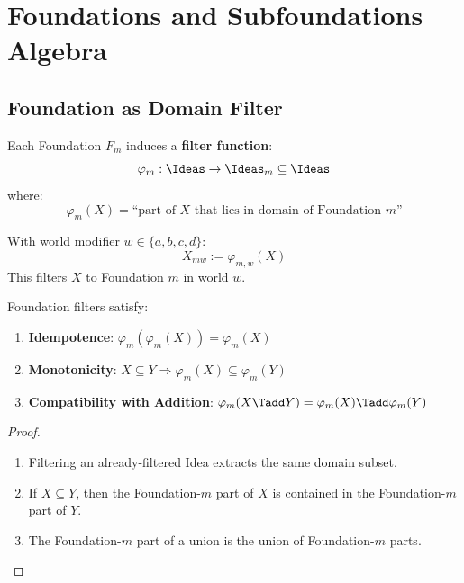 \chapter{Foundations and Subfoundations Algebra}
\label{ch:foundations-algebra}

\section{Foundation as Domain Filter}

\begin{definition}
\label{def:foundation-filter}
Each Foundation $F_m$ induces a \textbf{filter function}:
\[
\varphi_m : \Ideas \to \Ideas_m \subseteq \Ideas
\]
where:
\[
\varphi_m(X) = \text{``part of } X \text{ that lies in domain of Foundation } m\text{''}
\]
\end{definition}

\begin{definition}
\label{def:subfound-filter}
With world modifier $w \in \{a, b, c, d\}$:
\[
X_{mw} := \varphi_{m,w}(X)
\]
This filters $X$ to Foundation $m$ in world $w$.
\end{definition}

\begin{theorem}
\label{thm:filter-props}
Foundation filters satisfy:
\begin{enumerate}
  \item \textbf{Idempotence}: $\varphi_m(\varphi_m(X)) = \varphi_m(X)$
  \item \textbf{Monotonicity}: $X \subseteq Y \Rightarrow \varphi_m(X) \subseteq \varphi_m(Y)$
  \item \textbf{Compatibility with Addition}: $\varphi_m(X \Tadd Y) = \varphi_m(X) \Tadd \varphi_m(Y)$
\end{enumerate}
\end{theorem}

\begin{proof}
\begin{enumerate}
  \item Filtering an already-filtered Idea extracts the same domain subset.
  \item If $X \subseteq Y$, then the Foundation-$m$ part of $X$ is contained in the Foundation-$m$ part of $Y$.
  \item The Foundation-$m$ part of a union is the union of Foundation-$m$ parts.
\end{enumerate}
\end{proof}

